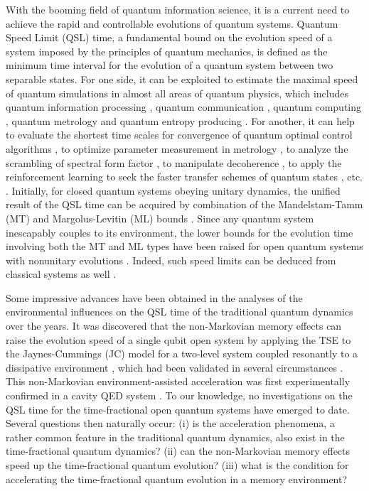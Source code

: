 \documentclass[
showpacs,  %
showkeys,  %
aps,       %
amsthm,    %
amsmath,   %
amsfonts,  %
amssymb    %
]{revtex4-1}          %
\begin{document}
With the booming field of quantum information science, it is a current need to achieve the rapid and controllable evolutions of quantum systems. Quantum Speed Limit (QSL) time, a fundamental bound on the evolution speed of a system imposed by the principles of quantum mechanics, is defined as the minimum time interval for the evolution of a quantum system between two separable states. For one side, it can be exploited to estimate the maximal speed of quantum simulations in almost all areas of quantum physics, which includes quantum information processing \cite{Lloyd2002}, quantum communication \cite{Lloyd2000}, quantum computing \cite{Bekenstein1981}, quantum metrology \cite{Giovanetti2011} and quantum entropy producing \cite{Deffner2010}. For another, it can help to evaluate the shortest time scales for convergence of quantum optimal control algorithms \cite{Hegerfeldt2013}, to optimize parameter measurement in metrology \cite{Braun2018}, to analyze the scrambling of spectral form factor \cite{Campo2017}, to manipulate decoherence \cite{Chenu2017}, to apply the reinforcement learning to seek the faster transfer schemes of quantum states \cite{Zhang2018}, etc. \cite{Fogarty2020,Deffner2020}. Initially, for closed quantum systems obeying unitary dynamics, the unified result of the QSL time can be acquired by combination of the Mandelstam-Tamm (MT) \cite{Mandelstam1991} and Margolus-Levitin (ML) bounds \cite{Margolus1998}. Since any quantum system inescapably couples to its environment, the lower bounds for the evolution time involving both the MT and ML types have been raised for open quantum systems with nonunitary evolutions \cite{ZhangYJ2014,Marvian2015,Campaioli2019}. Indeed, such speed limits can be deduced from classical systems as well \cite{Shanahan2018,Okuyama2018}.

Some impressive advances have been obtained in the analyses of the environmental influences on the QSL time of the traditional quantum dynamics over the years. It was discovered that the non-Markovian memory effects can raise the evolution speed of a single qubit open system by applying the TSE to the Jaynes-Cummings (JC) model for a two-level system coupled resonantly to a dissipative environment \cite{Deffner2013}, which had been validated in several circumstances \cite{XuZY2014,CaiXJ2017,XuK2018}. This non-Markovian environment-assisted acceleration was first experimentally confirmed in a cavity QED system \cite{Cimmarusti2015}. To our knowledge, no investigations on the QSL time for the time-fractional open quantum systems have emerged to date. Several questions then naturally occur: (i) is the acceleration phenomena, a rather common feature in the traditional quantum dynamics, also exist in the time-fractional quantum dynamics? (ii) can the non-Markovian memory effects speed up the time-fractional quantum evolution? (iii) what is the condition for accelerating the time-fractional quantum evolution in a memory environment?
\end{document}
